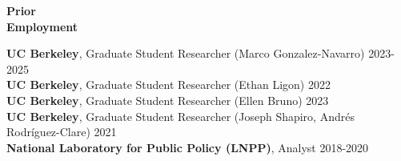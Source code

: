 \documentclass[10pt, oneside]{article}
\begin{document}
\begin{minipage}[t]{0.1\linewidth}
\textbf{Prior \\ Employment}
\end{minipage}\hspace{0.05\linewidth}
\begin{minipage}[t]{0.8\linewidth}
\textbf{UC Berkeley}, Graduate Student Researcher (Marco Gonzalez-Navarro) \hfill 2023-2025 \\
\textbf{UC Berkeley}, Graduate Student Researcher (Ethan Ligon) \hfill 2022 \\
\textbf{UC Berkeley}, Graduate Student Researcher (Ellen Bruno) \hfill 2023 \\
\textbf{UC Berkeley}, Graduate Student Researcher (Joseph Shapiro, Andrés Rodríguez-Clare) \hfill 2021 \\
\textbf{National Laboratory for Public Policy (LNPP)}, Analyst \hfill 2018-2020 \\
\end{minipage}\vspace{5mm}

\begin{minipage}[t]{0.1\linewidth}
\textbf{}
\end{minipage}\hspace{0.05\linewidth}
\hspace{0.05\linewidth}
\begin{minipage}[t]{0.8\linewidth}


\end{minipage}\vspace{5mm}
\end{document}
